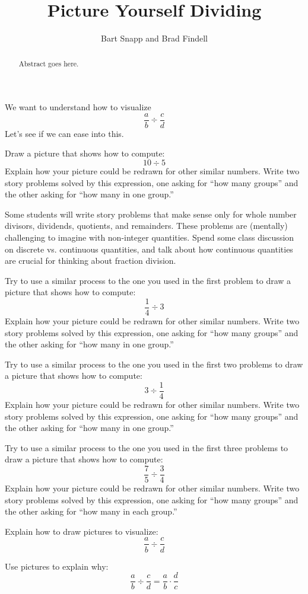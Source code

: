 \documentclass{ximera}
\title{Picture Yourself Dividing}
\author{Bart Snapp and Brad Findell}
\begin{document}
\begin{abstract}
Abstract goes here.  
\end{abstract}
\maketitle


We want to understand how to visualize 
\[
\frac{a}{b} \div \frac{c}{d}
\]
Let's see if we can ease into this.

\begin{problem}
Draw a picture that shows how to compute:
\[
10\div 5
\]
Explain how your picture could be redrawn for other similar
numbers. Write two story problems solved by this expression, one
asking for ``how many groups'' and the other asking for ``how many in
one group.''
\end{problem}

\begin{teachingnote}
Some students will write story problems that make sense only for whole number divisors, dividends, quotients, and remainders.  These problems are (mentally) challenging to imagine with non-integer quantities.  Spend some class discussion on discrete vs. continuous quantities, and talk about how continuous quantities are crucial for thinking about fraction division.  
\end{teachingnote}

\begin{problem}
Try to use a similar process to the one you used in the first problem
to draw a picture that shows how to compute:
\[
\frac{1}{4} \div 3
\]
Explain how your picture could be redrawn for other similar numbers.
Write two story problems solved by this expression, one asking for
``how many groups'' and the other asking for ``how many in one
group.''
\end{problem}


\begin{problem}
Try to use a similar process to the one you used in the first two problems
to draw a picture that shows how to compute:
\[
3 \div \frac{1}{4}
\]
Explain how your picture could be redrawn for other similar numbers.
Write two story problems solved by this expression, one asking for
``how many groups'' and the other asking for ``how many in one
group.''
\end{problem}


\begin{problem}
Try to use a similar process to the one you used in the first three problems
to draw a picture that shows how to compute:
\[
\frac{7}{5} \div \frac{3}{4}
\]
Explain how your picture could be redrawn for other similar numbers.
Write two story problems solved by this expression, one asking for
``how many groups'' and the other asking for ``how many in each
group.''
\end{problem}

\begin{problem}
Explain how to draw pictures to visualize:
\[
\frac{a}{b} \div \frac{c}{d}
\]
\end{problem}

\begin{problem}
Use pictures to explain why:
\[
\frac{a}{b} \div \frac{c}{d} = \frac{a}{b} \cdot \frac{d}{c}
\]
\end{problem}
\end{document}
